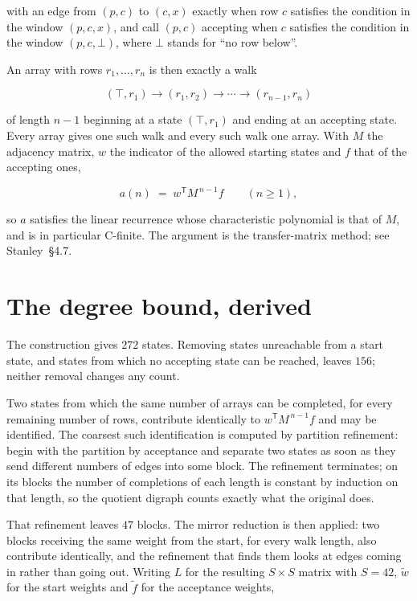 \documentclass[11pt]{article}
\theoremstyle{definition}
\begin{document}
with an edge from $(p,c)$ to $(c,x)$ exactly when row $c$ satisfies the condition in the window $(p,c,x)$, and call $(p,c)$ accepting when $c$ satisfies the condition in the window $(p,c,\bot)$, where $\bot$ stands for ``no row below''.

An array with rows $r_1,\dots,r_n$ is then exactly a walk

\[(\top,r_1) \to (r_1,r_2) \to \cdots \to (r_{n-1},r_n)\]

of length $n-1$ beginning at a state $(\top,r_1)$ and ending at an accepting state. Every array gives one such walk and every such walk one array. With $M$ the adjacency matrix, $w$ the indicator of the allowed starting states and $f$ that of the accepting ones,

\[a(n) \;=\; w^{\mathsf T} M^{\,n-1} f \qquad (n \ge 1),\]

so $a$ satisfies the linear recurrence whose characteristic polynomial is that of $M$, and is in particular C-finite. The argument is the transfer-matrix method; see Stanley~\S4.7.

\section{The degree bound, derived}

The construction gives $272$ states. Removing states unreachable from a start state, and states from which no accepting state can be reached, leaves $156$; neither removal changes any count.

Two states from which the same number of arrays can be completed, for every remaining number of rows, contribute identically to $w^{\mathsf T}M^{\,n-1}f$ and may be identified. The coarsest such identification is computed by partition refinement: begin with the partition by acceptance and separate two states as soon as they send different numbers of edges into some block. The refinement terminates; on its blocks the number of completions of each length is constant by induction on that length, so the quotient digraph counts exactly what the original does.

That refinement leaves $47$ blocks. The mirror reduction is then applied: two blocks receiving the same weight from the start, for every walk length, also contribute identically, and the refinement that finds them looks at edges coming in rather than going out. Writing $L$ for the resulting $S \times S$ matrix with $S = 42$, $\tilde w$ for the start weights and $\tilde f$ for the acceptance weights,
\end{document}
